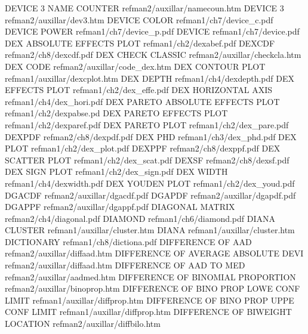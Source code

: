 DEVICE 3 NAME COUNTER                   refman2/auxillar/namecoun.htm
DEVICE 3                                refman2/auxillar/dev3.htm
DEVICE COLOR                            refman1/ch7/device_c.pdf
DEVICE POWER                            refman1/ch7/device_p.pdf
DEVICE                                  refman1/ch7/device.pdf
DEX ABSOLUTE EFFECTS PLOT               refman1/ch2/dexabef.pdf
DEXCDF                                  refman2/ch8/dexcdf.pdf
DEX CHECK CLASSIC                       refman2/auxillar/checkcla.htm
DEX CODE                                refman2/auxillar/code_dex.htm
DEX CONTOUR PLOT                        refman1/auxillar/dexcplot.htm
DEX DEPTH                               refman1/ch4/dexdepth.pdf
DEX EFFECTS PLOT                        refman1/ch2/dex_effe.pdf
DEX HORIZONTAL AXIS                     refman1/ch4/dex_hori.pdf
DEX PARETO ABSOLUTE EFFECTS PLOT        refman1/ch2/dexpabse.pd
DEX PARETO EFFECTS PLOT                 refman1/ch2/dexparef.pdf
DEX PARETO PLOT                         refman1/ch2/dex_pare.pdf
DEXPDF                                  refman2/ch8/dexpdf.pdf
DEX PHD                                 refman1/ch3/dex_phd.pdf
DEX PLOT                                refman1/ch2/dex_plot.pdf
DEXPPF                                  refman2/ch8/dexppf.pdf
DEX SCATTER PLOT                        refman1/ch2/dex_scat.pdf
DEXSF                                   refman2/ch8/dexsf.pdf
DEX SIGN PLOT                           refman1/ch2/dex_sign.pdf
DEX WIDTH                               refman1/ch4/dexwidth.pdf
DEX YOUDEN PLOT                         refman1/ch2/dex_youd.pdf
DGACDF                                  refman2/auxillar/dgacdf.pdf
DGAPDF                                  refman2/auxillar/dgapdf.pdf
DGAPPF                                  refman2/auxillar/dgappf.pdf
DIAGONAL MATRIX                         refman2/ch4/diagonal.pdf
DIAMOND                                 refman1/ch6/diamond.pdf
DIANA CLUSTER                           refman1/auxillar/cluster.htm
DIANA                                   refman1/auxillar/cluster.htm
DICTIONARY                              refman1/ch8/dictiona.pdf
DIFFERENCE OF AAD                       refman2/auxillar/diffaad.htm
DIFFERENCE OF AVERAGE ABSOLUTE DEVI     refman2/auxillar/diffaad.htm
DIFFERENCE OF AAD TO MED                refman2/auxillar/aadmed.htm
DIFFERENCE OF BINOMIAL PROPORTION       refman2/auxillar/binoprop.htm
DIFFERENCE OF BINO PROP LOWE CONF LIMIT refman1/auxillar/diffprop.htm
DIFFERENCE OF BINO PROP UPPE CONF LIMIT refman1/auxillar/diffprop.htm
DIFFERENCE OF BIWEIGHT LOCATION         refman2/auxillar/diffbilo.htm
